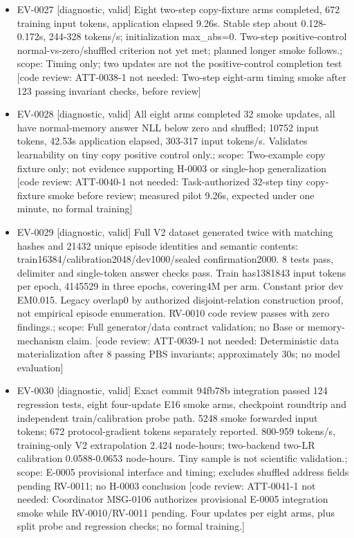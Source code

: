 \documentclass[11pt]{article}
\begin{document}
\begin{itemize}
\item EV-0027 [diagnostic, valid] Eight two-step copy-fixture arms completed, 672 training input tokens, application elapsed 9.26s. Stable step about 0.128-0.172s, 244-328 tokens/s; initialization max\_abs=0. Two-step positive-control normal-vs-zero/shuffled criterion not yet met; planned longer smoke follows.; scope: Timing only; two updates are not the positive-control completion test [code review: ATT-0038-1 not needed: Two-step eight-arm timing smoke after 123 passing invariant checks, before review]
\item EV-0028 [diagnostic, valid] All eight arms completed 32 smoke updates, all have normal-memory answer NLL below zero and shuffled; 10752 input tokens, 42.53s application elapsed, 303-317 input tokens/s. Validates learnability on tiny copy positive control only.; scope: Two-example copy fixture only; not evidence supporting H-0003 or single-hop generalization [code review: ATT-0040-1 not needed: Task-authorized 32-step tiny copy-fixture smoke before review; measured pilot 9.26s, expected under one minute, no formal training]
\item EV-0029 [diagnostic, valid] Full V2 dataset generated twice with matching hashes and 21432 unique episode identities and semantic contents: train16384/calibration2048/dev1000/sealed confirmation2000. 8 tests pass, delimiter and single-token answer checks pass. Train has1381843 input tokens per epoch, 4145529 in three epochs, covering4M per arm. Constant prior dev EM0.015. Legacy overlap0 by authorized disjoint-relation construction proof, not empirical episode enumeration. RV-0010 code review passes with zero findings.; scope: Full generator/data contract validation; no Base or memory-mechanism claim. [code review: ATT-0039-1 not needed: Deterministic data materialization after 8 passing PBS invariants; approximately 30s; no model evaluation]
\item EV-0030 [diagnostic, valid] Exact commit 94fb78b integration passed 124 regression tests, eight four-update E16 smoke arms, checkpoint roundtrip and independent train/calibration probe path. 5248 smoke forwarded input tokens; 672 protocol-gradient tokens separately reported. 800-959 tokens/s, training-only V2 extrapolation 2.424 node-hours; two-backend two-LR calibration 0.0588-0.0653 node-hours. Tiny sample is not scientific validation.; scope: E-0005 provisional interface and timing; excludes shuffled address fields pending RV-0011; no H-0003 conclusion [code review: ATT-0041-1 not needed: Coordinator MSG-0106 authorizes provisional E-0005 integration smoke while RV-0010/RV-0011 pending. Four updates per eight arms, plus split probe and regression checks; no formal training.]

\end{itemize}
\end{document}
